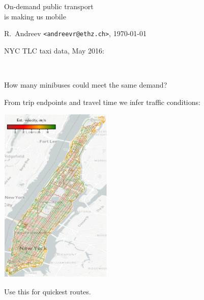 \documentclass{beamer}
\begin{document}
\begin{frame}[fragile]
	\vspace{0.3\textheight}
	
	\begin{center}
		\large
		On-demand public transport \\
		\small
		{\color{gray} is making us mobile }
	\end{center}
	

	\tiny
	R.~Andreev \verb|<andreevr@ethz.ch>|, \today
	\hfill
	\tiny\color{lightgray}\hfill{\DTMnow}
\end{frame}


\begin{frame}
	NYC TLC taxi data, May 2016:
	
	{\ }
	
	\resizebox{\textwidth}{!}{}
	
	\vspace{2\baselineskip}
	
	How many minibuses could meet the same demand?
\end{frame}


\begin{frame}[t]
	From trip endpoints and travel time
	we infer traffic conditions:
	
	\begin{center}
		\includegraphics[width=0.40\textwidth]{20210613-GraphWithLag/b_train/v1/lag/H=18/UTC-20210615-132827/train/velocity_i=9.png}
	\end{center}
	
	Use this for quickest routes.
\end{frame}
\end{document}
